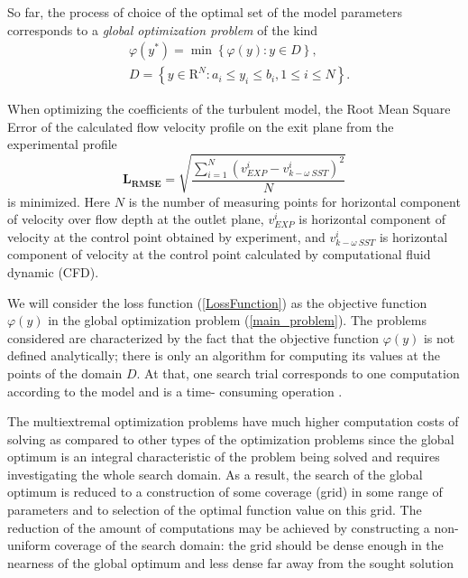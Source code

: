 \documentclass[sensors,article,submit,moreauthors,pdftex]{Definitions/mdpi}
\begin{document}
So far, the process of choice of the optimal set of the model parameters corresponds to a \textit{global optimization problem} of the kind
\begin{eqnarray}\label{main_problem}
& \varphi(y^\ast)=\min{\left\{\varphi(y):y\in D\right\}},\\
& D=\left\{y\in \text{R}^N: a_i\leq y_i \leq b_i, 1\leq i \leq N\right\}. \nonumber
\end{eqnarray}

When optimizing the coefficients of the turbulent model, the Root Mean Square Error of the calculated flow velocity profile on the exit plane from the experimental profile 
\begin{equation}
	\label{LossFunction}
	\boldsymbol{L_{RMSE}} = \sqrt{\frac{\sum\limits_{i=1}^{N} \left( v_{EXP}^i - v_{k-\omega\ SST}^i \right)^2}{N}}
\end{equation}
is minimized. 
Here $N$ is the number of measuring points for horizontal component of velocity over flow depth at the outlet plane, $v_{EXP}^i$ is horizontal component of velocity at the control point obtained by experiment, and $v_{k-\omega\ SST}^i$  is horizontal component of velocity at the control point calculated by computational fluid dynamic (CFD). 

We will consider the loss function (\ref{LossFunction}) as the objective function $\varphi(y)$ in the global optimization problem (\ref{main_problem}). 
The problems considered are characterized by the fact that the objective function $\varphi(y)$ is not defined analytically; there is only an algorithm for computing its values at the points of the domain $D$. At that, one search trial corresponds to one computation according to the model and is a time- consuming operation \cite{Kalyulin2017,Paulavicius2020}.

The multiextremal optimization problems have much higher computation costs of solving as compared to other types of the optimization problems since the global optimum is an integral characteristic of the problem being solved and requires investigating the whole search domain. As a result, the search of the global optimum is reduced to a construction of some coverage (grid) in some range of parameters and to selection of the optimal function value on this grid. The reduction of the amount of computations may be achieved by constructing a non-uniform coverage of the search domain: the grid should be dense enough in the nearness of the global optimum and less dense far away from the sought solution
\end{document}
